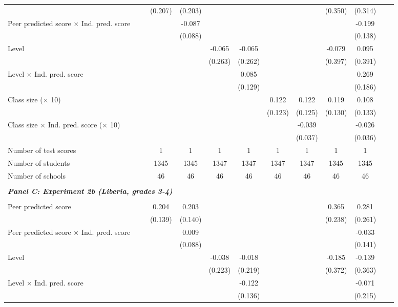 \begin{center}
\begin{scriptsize}
\begin{threeparttable}
\begin{tabular} {@{} l l c c c c c c c c c c  @{}}
                 &  & (0.207) & (0.203) &  &  &  &  & (0.350) & (0.314) \\
Peer predicted score $\times$ Ind. pred. score &  &  & -0.087 &  &  &  &  &  & -0.199 \\
                 &  &  & (0.088) &  &  &  &  &  & (0.138) \\
Level &  &  &  & -0.065 & -0.065 &  &  & -0.079 & 0.095 \\
                 &  &  &  & (0.263) & (0.262) &  &  & (0.397) & (0.391) \\
Level $\times$ Ind. pred. score &  &  &  &  & 0.085 &  &  &  & 0.269 \\
                 &  &  &  &  & (0.129) &  &  &  & (0.186) \\
Class size ($\times$ 10) &  &  &  &  &  & 0.122 & 0.122 & 0.119 & 0.108 \\
                 &  &  &  &  &  & (0.123) & (0.125) & (0.130) & (0.133) \\
Class size $\times$ Ind. pred. score ($\times$ 10) &  &  &  &  &  &  & -0.039 &  & -0.026 \\
                 &  &  &  &  &  &  & (0.037) &  & (0.036) \\
\midrule
Number of test scores &  & 1 & 1 & 1 & 1 & 1 & 1 & 1 & 1 \\
Number of students &  & 1345 & 1345 & 1347 & 1347 & 1347 & 1347 & 1345 & 1345 \\
Number of schools &  & 46 & 46 & 46 & 46 & 46 & 46 & 46 & 46 \\
 \midrule
\\
\multicolumn{3}{l}{\textbf{\textit{Panel C: Experiment 2b (Liberia, grades 3-4)}}} \\
\\
Peer predicted score &  & 0.204 & 0.203 &  &  &  &  & 0.365 & 0.281 \\
                 &  & (0.139) & (0.140) &  &  &  &  & (0.238) & (0.261) \\
Peer predicted score $\times$ Ind. pred. score &  &  & 0.009 &  &  &  &  &  & -0.033 \\
                 &  &  & (0.088) &  &  &  &  &  & (0.141) \\
Level &  &  &  & -0.038 & -0.018 &  &  & -0.185 & -0.139 \\
                 &  &  &  & (0.223) & (0.219) &  &  & (0.372) & (0.363) \\
Level $\times$ Ind. pred. score &  &  &  &  & -0.122 &  &  &  & -0.071 \\
                 &  &  &  &  & (0.136) &  &  &  & (0.215) \\

\end{tabular}
\end{threeparttable}
\end{scriptsize}
\end{center}
